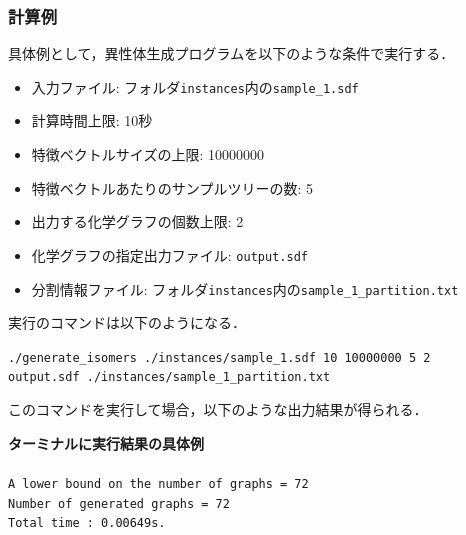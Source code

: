 \documentclass[11pt,titlepage,dvipdfmx,twoside]{jsbook}
\begin{document}
\subsubsection{計算例}
\label{chap:instance_g}

具体例として，異性体生成プログラムを以下のような条件で実行する．

\begin{itemize}
\item 入力ファイル: フォルダ{\tt instances}内の{\tt sample\_1.sdf}
\item 計算時間上限: 10秒
\item 特徴ベクトルサイズの上限: 10000000
\item 特徴ベクトルあたりのサンプルツリーの数: 5
\item 出力する化学グラフの個数上限: 2
\item 化学グラフの指定出力ファイル: {\tt output.sdf}
\item 分割情報ファイル: フォルダ{\tt instances}内の{\tt sample\_1\_partition.txt}
\end{itemize}

実行のコマンドは以下のようになる．

\bigskip


{\tt ./generate\_isomers ./instances/sample\_1.sdf 10 10000000 5 2} \\
 {\tt output.sdf ./instances/sample\_1\_partition.txt}	


\bigskip

このコマンドを実行して場合，以下のような出力結果が得られる．

\begin{oframed}
{\bf ターミナルに実行結果の具体例}\\\\
{\tt A lower bound on the number of graphs = 72\\
Number of generated graphs = 72\\
Total time : 0.00649s.}
\end{oframed}
\end{document}
